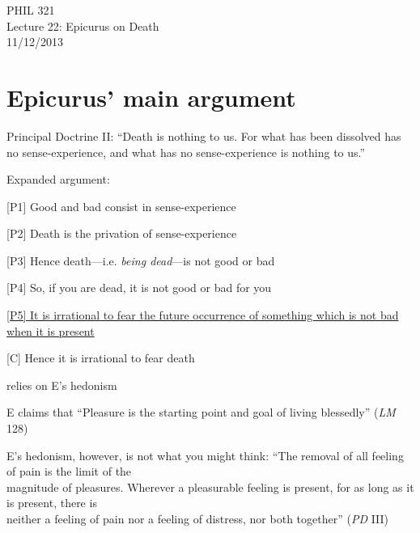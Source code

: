 \documentclass[11pt]{article}
\begin{document}
\thispagestyle{empty}
\begin{center} \LARGE{PHIL 321\\ Lecture 22: Epicurus on Death}\\ \vspace*{2mm}
\large{11/12/2013}\end{center}
\thispagestyle{empty}\vspace*{3mm}
\vspace*{-8mm}

\section*{Epicurus' main argument}

\noindent Principal Doctrine II: ``Death is nothing to us. For what has been dissolved has no sense-experience, and what has no sense-experience is nothing to us.''
\vspace*{2mm}

\noindent Expanded argument:
\vspace*{2mm}

[P1] Good and bad consist in sense-experience
\vspace*{1mm}

[P2] Death is the privation of sense-experience
\vspace*{1mm}

[P3] Hence death---i.e. \emph{being dead}---is not good or bad
\vspace*{1mm}

[P4] So, if you are dead, it is not good or bad for you
\vspace*{1mm}

\underline{[P5] It is irrational to fear the future occurrence of something which is not bad when it is present}
\vspace*{1mm}

[C] Hence it is irrational to fear death
\vspace{2mm}

\noindent [P1] relies on E's hedonism
\vspace*{1mm}

E claims that ``Pleasure is the starting point and goal of living blessedly'' (\emph{LM} 128)
\vspace*{1mm}

E's hedonism, however, is not what you might think: ``The removal of all feeling of pain is the limit of the\\\hspace*{6mm}magnitude of pleasures. Wherever a pleasurable feeling is present, for as long as it is present, there is\\\hspace*{6mm}neither a feeling of pain nor a feeling of distress, nor both together'' (\emph{PD} III)
\vspace*{2mm}
\end{document}
